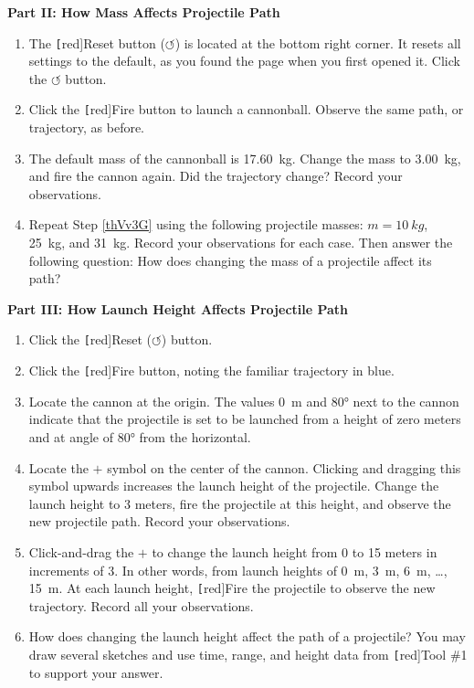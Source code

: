 \documentclass[main-physics.tex]{subfiles}
\begin{document}
\vspace{1em}

\textbf{Part II: How Mass Affects Projectile Path}

\begin{enumerate}
    \item The \texttt[red]{Reset} button ($\boldsymbol{\circlearrowleft}$) is located at the bottom right corner. It resets all settings to the default, as you found the page when you first opened it. Click the $\boldsymbol{\circlearrowleft}$ button.
    \item Click the \texttt[red]{Fire} button to launch a cannonball. Observe the same path, or trajectory, as before.
    \item \label{thVv3G} The default mass of the cannonball is \SI{17.60}{kg}. Change the mass to \SI{3.00}{kg}, and fire the cannon again. Did the trajectory change? Record your observations. 
    \item Repeat Step \ref{thVv3G} using the following projectile masses: $m=\SI{10}{kg}$, \SI{25}{kg}, and \SI{31}{kg}. Record your observations for each case. Then answer the following question: How does changing the mass of a projectile affect its path?
\end{enumerate}

\vspace{1em}

\textbf{Part III: How Launch Height Affects Projectile Path}
\begin{enumerate}
    \item Click the \texttt[red]{Reset} ($\boldsymbol{\circlearrowleft}$) button.
    \item Click the \texttt[red]{Fire} button, noting the familiar trajectory in blue.
    \item Locate the cannon at the origin. The values \SI{0}{m} and \ang{80} next to the cannon indicate that the projectile is set to be launched from a height of zero meters and at angle of \ang{80} from the horizontal.
    \item Locate the $\boldsymbol{+}$ symbol on the center of the cannon. Clicking and dragging this symbol upwards increases the launch height of the projectile. Change the launch height to 3 meters, fire the projectile at this height, and observe the new projectile path. Record your observations.
    \item Click-and-drag the $\boldsymbol{+}$ to change the launch height from 0 to 15 meters in increments of 3. In other words, from launch heights of \SI{0}{m}, \SI{3}{m}, \SI{6}{m}, \ldots, \SI{15}{m}. At each launch height, \texttt[red]{Fire} the projectile to observe the new trajectory. Record all your observations. 
    \item How does changing the launch height affect the path of a projectile? You may draw several sketches and use time, range, and height data from \texttt[red]{Tool \#1} to support your answer.
\end{enumerate}
\end{document}
